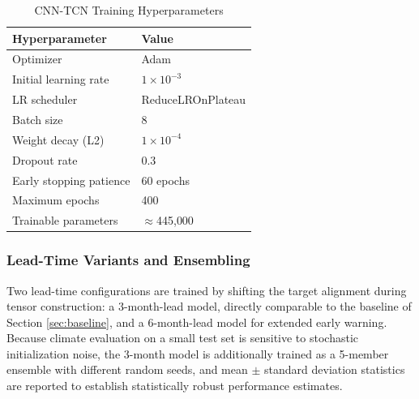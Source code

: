 \documentclass[conference]{IEEEtran}
\begin{document}
\begin{table}[t]
\centering
\caption{CNN-TCN Training Hyperparameters}
\label{tab:hyperparams}
\begin{tabular}{@{}ll@{}}
\toprule
\textbf{Hyperparameter} & \textbf{Value} \\
\midrule
Optimizer & Adam \\
Initial learning rate & $1\times10^{-3}$ \\
LR scheduler & ReduceLROnPlateau \\
Batch size & 8 \\
Weight decay (L2) & $1\times10^{-4}$ \\
Dropout rate & 0.3 \\
Early stopping patience & 60 epochs \\
Maximum epochs & 400 \\
Trainable parameters & $\approx$445{,}000 \\
\bottomrule
\end{tabular}
\end{table}

\subsubsection{Lead-Time Variants and Ensembling}
Two lead-time configurations are trained by shifting the target alignment during tensor construction: a 3-month-lead model, directly comparable to the baseline of Section \ref{sec:baseline}, and a 6-month-lead model for extended early warning. Because climate evaluation on a small test set is sensitive to stochastic initialization noise, the 3-month model is additionally trained as a 5-member ensemble with different random seeds, and mean $\pm$ standard deviation statistics are reported to establish statistically robust performance estimates.
\end{document}
